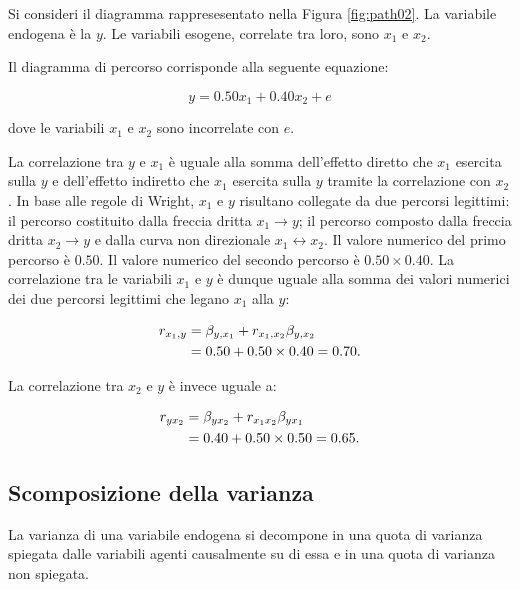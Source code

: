 \documentclass[
  11pt,
]{krantz}
\theoremstyle{definition}
\theoremstyle{definition}
\theoremstyle{definition}
\theoremstyle{definition}
\theoremstyle{remark}
\begin{document}
Si consideri il diagramma rappresesentato nella Figura \ref{fig:path02}. La variabile endogena è la \(y\). Le variabili esogene, correlate tra loro, sono \(x_1\) e \(x_2\).

Il diagramma di percorso corrisponde alla seguente equazione:

\[y = 0.50 x_1 + 0.40 x_2 + e\]

dove le variabili \(x_1\) e \(x_2\) sono incorrelate con \(e\).

La correlazione tra \(y\) e \(x_1\) è uguale alla somma dell'effetto diretto che \(x_1\) esercita sulla \(y\) e dell'effetto indiretto che \(x_1\) esercita sulla \(y\) tramite la correlazione con \(x_2\). In base alle regole di Wright, \(x_1\) e \(y\) risultano collegate da due percorsi legittimi: il percorso costituito dalla freccia dritta \(x_1 \rightarrow  y\); il percorso composto dalla freccia dritta \(x_2 \rightarrow  y\) e dalla curva non direzionale \(x_1 \leftrightarrow x_2\). Il valore numerico del primo percorso è \(0.50\). Il valore numerico del secondo percorso è \(0.50\times 0.40\). La correlazione tra le variabili \(x_1\) e \(y\) è dunque uguale alla somma dei valori numerici dei due percorsi legittimi che legano \(x_1\) alla \(y\):

\begin{equation}
\begin{aligned}
  r_{x_1,y} &= \beta_{y,x_1} + r_{x_1,x_2} \beta_{y,x_2}\notag\\
  &=   0.50 + 0.50 \times 0.40 = 0.70.\notag
\end{aligned}
\end{equation}

La correlazione tra \(x_2\) e \(y\) è invece uguale a:

\begin{equation}
\begin{aligned}
  r_{yx_2} &=\beta_{yx_2} + r_{x_1x_2} \beta_{yx_1}\notag\\
  &= 0.40 + 0.50 \times 0.50 = 0.65.\notag
\end{aligned}
\end{equation}

\hypertarget{scomposizione-della-varianza}{%
\subsection{Scomposizione della varianza}\label{scomposizione-della-varianza}}

La varianza di una variabile endogena si decompone in una quota di varianza spiegata dalle variabili agenti causalmente su di essa e in una quota di varianza non spiegata.
\end{document}
